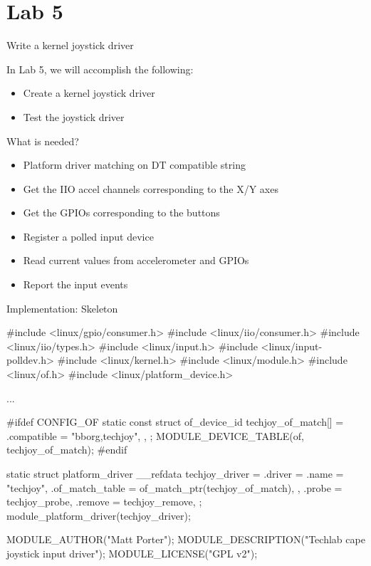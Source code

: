 \section{Lab 5}

\begin{frame}
   {Write a kernel joystick driver}

   In Lab 5, we will accomplish the following:
	\begin{itemize}
		\item
			Create a kernel joystick driver
		\item
			Test the joystick driver
	\end{itemize}
\end{frame}

\begin{frame}
	{What is needed?}

	\begin{itemize}
		\item
			Platform driver matching on DT compatible string
		\item
			Get the IIO accel channels corresponding to the X/Y axes
		\item
			Get the GPIOs corresponding to the buttons
		\item
			Register a polled input device
		\item
			Read current values from accelerometer and GPIOs
		\item
			Report the input events
	\end{itemize}
\end{frame}

\begin{frame}
   {Implementation: Skeleton}

	\begin{rawscriptsize}
#include <linux/gpio/consumer.h>
#include <linux/iio/consumer.h>
#include <linux/iio/types.h>
#include <linux/input.h>
#include <linux/input-polldev.h>
#include <linux/kernel.h>
#include <linux/module.h>
#include <linux/of.h>
#include <linux/platform_device.h>

...

#ifdef CONFIG_OF
static const struct of_device_id techjoy_of_match[] = {
        { .compatible = "bborg,techjoy", },
        { }
};
MODULE_DEVICE_TABLE(of, techjoy_of_match);
#endif

static struct platform_driver __refdata techjoy_driver = {
        .driver = {
                .name = "techjoy",
                .of_match_table = of_match_ptr(techjoy_of_match),
        },
        .probe = techjoy_probe,
        .remove = techjoy_remove,
};
module_platform_driver(techjoy_driver);

MODULE_AUTHOR("Matt Porter");
MODULE_DESCRIPTION("Techlab cape joystick input driver");
MODULE_LICENSE("GPL v2");
	\end{rawscriptsize}
\end{frame}

